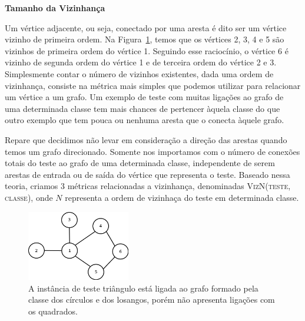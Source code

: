 \begin{description}

\item{\textbf{Tamanho da Vizinhança}}
\label{item::neighborhoodsize}

Um vértice adjacente, ou seja, conectado por uma aresta é dito ser um vértice vizinho de primeira ordem. Na Figura~\ref{fig::vizinhos}, temos que os vértices 2, 3, 4 e 5 são vizinhos de primeira ordem do vértice 1. Seguindo esse raciocínio, o vértice 6 é vizinho de segunda ordem do vértice 1 e de terceira ordem do vértice 2 e 3.
Simplesmente contar o número de vizinhos existentes, dada uma ordem de vizinhança, consiste na métrica mais simples que podemos utilizar para relacionar um vértice a um grafo. Um exemplo de teste com muitas ligações ao grafo de uma determinada classe tem mais chances de pertencer àquela classe do que outro exemplo que tem pouca ou nenhuma aresta que o conecta àquele grafo.

Repare que decidimos não levar em consideração a direção das arestas quando temos um grafo direcionado. Somente nos importamos com o número de conexões totais do teste ao grafo de uma determinada classe, independente de serem arestas de entrada ou de saída do vértice que representa o teste. Baseado nessa teoria, criamos 3 métricas relacionadas a vizinhança, denominadas \textsc{VizN(teste, classe)}, onde $N$ representa a ordem de vizinhaça do teste em determinada classe.


\begin{figure}[ht!]
\centering
\includegraphics[width=0.4\textwidth]{figures/vizinhos.png}
\caption{A instância de teste triângulo está ligada ao grafo formado pela classe dos círculos e dos losangos, porém não apresenta ligações com os quadrados.}
\label{fig::vizinhos}
\end{figure}


\end{description}
